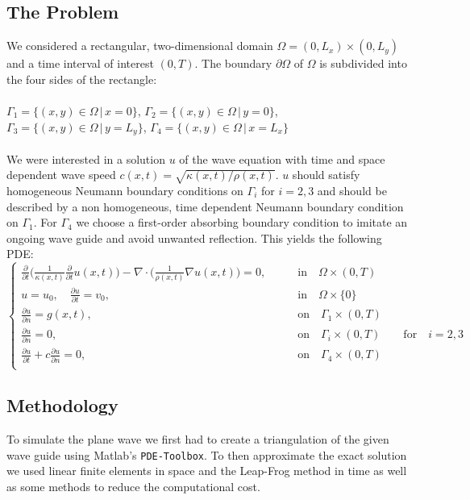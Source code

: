 \documentclass{article}
\begin{document}
\subsection{The Problem}
We considered a rectangular, two-dimensional domain $\Omega = (0,L_x) \times (0,L_y)$ and a time interval of interest $(0,T)$. The boundary $\partial\Omega$ of $\Omega$ is subdivided into the four sides of the rectangle: \\ \\
$\Gamma_1 = \{(x,y)\in \Omega\, |\, x = 0\}$, 
$\Gamma_2 = \{(x,y)\in \Omega\, |\, y = 0\}$,
$\Gamma_3 = \{(x,y)\in \Omega\, |\, y = L_y\}$,
$\Gamma_4 = \{(x,y)\in \Omega\, |\, x = L_x\}$ \\ \\
We were interested in a solution $u$ of the wave equation with time and space dependent wave speed $c(x,t) = \sqrt{\kappa (x,t)/\rho(x,t)}$. $u$ should satisfy homogeneous Neumann boundary conditions on $\Gamma_i$ for $i = 2,3$ and should be described by a non homogeneous, time dependent Neumann boundary condition on $\Gamma_1$. For $\Gamma_4$ we choose a first-order absorbing boundary condition to imitate an ongoing wave guide and avoid unwanted reflection. This yields the following PDE:
\begin{equation}\label{eq:strong formulation}
\left\{
\begin{aligned}
	\frac{\partial}{\partial t} \Big( \frac{1}{\kappa(x,t)}\frac{\partial}{\partial t}u(x,t)			\Big)-
	\nabla \cdot \Big(\frac{1}{\rho (x,t)}\nabla u(x,t)\Big) = 0, \qquad  &\text{in}					\quad \Omega \times (0,T) \\
	u = u_0, \quad \frac{\partial u}{\partial t} = v_0, \qquad &\text{in}\quad \Omega \times \{0\}\\
	\frac{\partial u}{\partial n} = g(x,t), \qquad &\text{on}\quad \Gamma_1 \times (0,T)\\
	\frac{\partial u}{\partial n} = 0, \qquad &\text{on}\quad \Gamma_i \times (0,T) \qquad
	\text{for}\quad i=2,3\\
	\frac{\partial u}{\partial t}+ c\frac{\partial u}{\partial n}=0, \qquad &\text{on}\quad 		\Gamma_4 \times (0,T)\\
\end{aligned}
\right.
\end{equation}
\subsection{Methodology}
To simulate the plane wave we first had to create a triangulation of the given wave guide using Matlab's \texttt{PDE-Toolbox}. To then approximate the exact solution we used linear finite elements in space and the Leap-Frog method in time as well as some methods to reduce the computational cost. 
\end{document}

